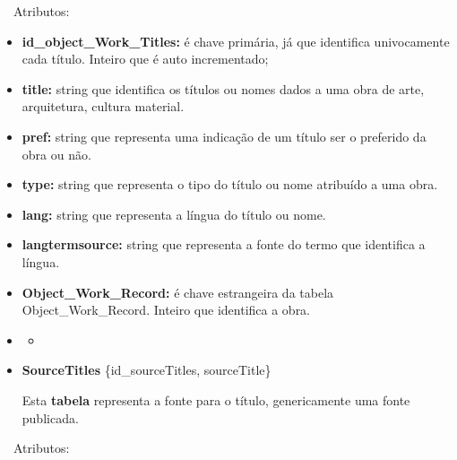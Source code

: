 \documentclass[letterpaper]{article}
\newcommand\textstyleStrongEmphasis[1]{\textbf{#1}}
\newcommand\liststyleLi{%
\renewcommand\labelitemi{{\textbullet}}
\renewcommand\labelitemii{[27A2?]}
\renewcommand\labelitemiii{{\textbullet}}
\renewcommand\labelitemiv{{\textbullet}}
}
\newcommand\liststyleLiii{%
\renewcommand\labelitemi{[27A2?]}
\renewcommand\labelitemii{[27A2?]}
\renewcommand\labelitemiii{[27A2?]}
\renewcommand\labelitemiv{[27A2?]}
}
\begin{document}
\bigskip

{
\ \ Atributos:}

\liststyleLiii
\begin{itemize}
\item {
\textbf{id\_object\_Work\_Titles:} \'e chave prim\'aria, j\'a que
identifica univocamente cada t\'itulo. Inteiro que \'e auto
incrementado;}
\item {
\textbf{title:} string que identifica os t\'itulos ou nomes dados a uma
obra de arte, arquitetura, cultura material.}
\item {
\textbf{pref:} string que representa uma indica\c{c}\~ao de um t\'itulo
ser o preferido da obra ou n\~ao.}
\item {
\textbf{type: }string que representa o tipo do t\'itulo ou nome
atribu\'ido a uma obra.}
\item {
\textbf{lang:} string que representa a l\'ingua do t\'itulo ou nome.}
\item {
\textbf{langtermsource: }string que representa a fonte do termo que
identifica a l\'ingua.}
\item {
\textbf{Object\_Work\_Record:} \'e chave estrangeira da tabela
Object\_Work\_Record. Inteiro que identifica a obra.}
\end{itemize}
\liststyleLi
\begin{itemize}
\item \begin{itemize}
\item[] 
\bigskip
\end{itemize}
\item {
\textbf{SourceTitles} \{id\_sourceTitles, sourceTitle\}}

\foreignlanguage{english}{Esta
}\textstyleStrongEmphasis{\foreignlanguage{english}{\textmd{tabela}}}\foreignlanguage{english}{
representa a fonte para o t\'itulo, genericamente uma fonte publicada.}
\end{itemize}

\bigskip

{
\ \ Atributos:}
\end{document}
